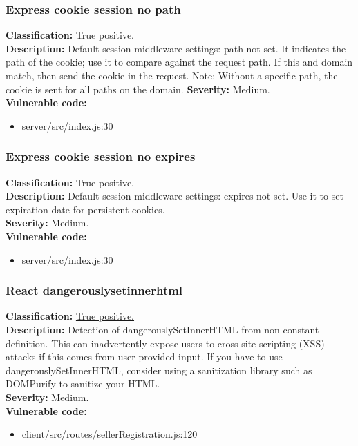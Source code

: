 \documentclass[]{article}
\begin{document}
\subsubsection{Express cookie session no path}
\textbf{Classification:} True positive. \\ 
\textbf{Description:} Default session middleware settings: path not set. It indicates the path of the cookie; use it to compare against the request path. If this and domain match, then send the cookie in the request. 
Note: Without a specific path, the cookie is sent for all paths on the domain.
\textbf{Severity:} Medium. \\ 
\textbf{Vulnerable code:} 
\begin{itemize}
    \item server/src/index.js:30
\end{itemize}

\subsubsection{Express cookie session no expires}
\textbf{Classification:} True positive. \\ 
\textbf{Description:}  Default session middleware settings: expires not set. Use it to set expiration date for persistent cookies. \\ 
\textbf{Severity:} Medium. \\ 
\textbf{Vulnerable code:} 
\begin{itemize}
    \item server/src/index.js:30
\end{itemize}

\subsubsection{React dangerouslysetinnerhtml}
\textbf{Classification:} \hyperref[par:stored_xss]{True positive.} \\ 
\textbf{Description:} Detection of dangerouslySetInnerHTML from non-constant definition. This can 
inadvertently expose users to cross-site scripting (XSS) attacks if this comes from user-provided
input. If you have to use dangerouslySetInnerHTML, consider using a sanitization library such as 
DOMPurify to sanitize your HTML. \\ 
\textbf{Severity:} Medium. \\ 
\textbf{Vulnerable code:} 
\begin{itemize}
    \item client/src/routes/sellerRegistration.js:120
\end{itemize}
\end{document}
